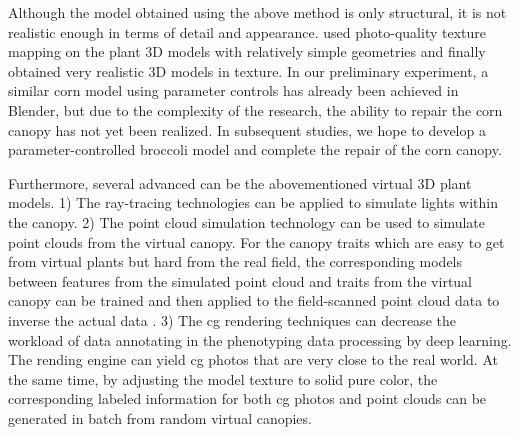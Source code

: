 Although the model obtained using the above method is only structural, it is not realistic enough in terms of detail and appearance. \citet{mikami_hidden_2022} used photo-quality texture mapping on the plant 3D models with relatively simple geometries and finally obtained very realistic 3D models in texture. In our preliminary experiment, a similar corn model using parameter controls has already been achieved in Blender, but due to the complexity of the research, the ability to repair the corn canopy has not yet been realized. In subsequent studies, we hope to develop a parameter-controlled broccoli model and complete the repair of the corn canopy.

Furthermore, several advanced  can be  the abovementioned virtual 3D plant models. 1) The ray-tracing technologies can be applied to simulate lights within the canopy. 2) The point cloud simulation technology can be used to simulate point clouds from the virtual canopy. For the canopy traits which are easy to get from virtual plants but hard from the real field, the corresponding models between features from the simulated point cloud and traits from the virtual canopy can be trained and then applied to the field-scanned point cloud data to inverse the actual data \citep{liu_estimating_2017}. 3) The \gls{cg} rendering techniques can decrease the workload of data annotating in the phenotyping data processing by deep learning. The rending engine can yield \gls{cg} photos that are very close to the real world. At the same time, by adjusting the model texture to solid pure color, the corresponding labeled information for both \gls{cg} photos \citep{mikami_hidden_2022} and point clouds \citep{chaudhury_3d_2020} can be generated in batch from random virtual canopies.

\subsection{}

